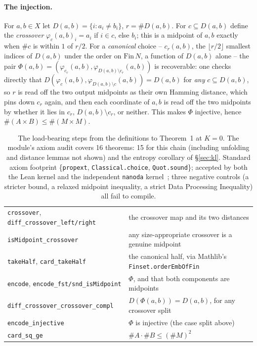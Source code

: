 \documentclass[11pt,a4paper]{article}
\newcommand{\lean}[1]{\texttt{\small #1}}
\begin{document}
\paragraph{The injection.} For $a,b\in X$ let $D(a,b)=\{i:a_i\ne b_i\}$, $r=\#D(a,b)$. For
$c\subseteq D(a,b)$ define the \emph{crossover} $\varphi_c(a,b)_i=a_i$ if $i\in c$, else $b_i$; this is a
midpoint of $a,b$ exactly when $\#c$ is within $1$ of $r/2$. For a \emph{canonical} choice --
$c_r(a,b)$, the $\lfloor r/2\rfloor$ smallest indices of $D(a,b)$ under the order on $\mathrm{Fin}\,N$,
a function of $D(a,b)$ alone -- the pair
$\Phi(a,b)=(\varphi_{c_r}(a,b),\varphi_{D(a,b)\setminus c_r}(a,b))$ is recoverable: one checks directly
that $D(\varphi_c(a,b),\varphi_{D(a,b)\setminus c}(a,b))=D(a,b)$ for \emph{any} $c\subseteq D(a,b)$, so
$r$ is read off the two output midpoints as their own Hamming distance, which pins down $c_r$ again, and
then each coordinate of $a,b$ is read off the two midpoints by whether it lies in $c_r$,
$D(a,b)\setminus c_r$, or neither. This makes $\Phi$ injective, hence
$\#(A\times B)\le\#(M\times M)$.

\begin{table}[h]\centering\small
\begin{tabular}{@{}ll@{}}
\toprule
\lean{crossover}, \lean{diff\_crossover\_left/right} & the crossover map and its two distances \\
\lean{isMidpoint\_crossover} & any size-appropriate crossover is a genuine midpoint \\
\lean{takeHalf}, \lean{card\_takeHalf} & the canonical half, via Mathlib's \lean{Finset.orderEmbOfFin} \\
\lean{encode}, \lean{encode\_fst/snd\_isMidpoint} & $\Phi$, and that both components are midpoints \\
\lean{diff\_crossover\_crossover\_compl} & $D(\Phi(a,b))=D(a,b)$, for any crossover split \\
\lean{encode\_injective} & $\Phi$ is injective (the case split above) \\
\lean{card\_sq\_ge} & \textbf{$\#A\cdot\#B\le(\#M)^2$} \\
\bottomrule
\end{tabular}
\caption{The load-bearing steps from the definitions to Theorem~1 at $K=0$. The module's axiom audit
covers 16 theorems: 15 for this chain (including unfolding and distance lemmas not shown) and the
entropy corollary of \S\ref{sec:kl}. Standard axiom
footprint \{\lean{propext}, \lean{Classical.choice}, \lean{Quot.sound}\}; accepted by both the Lean
kernel and the independent \lean{nanoda} kernel~\cite{Comparator}; three negative controls (a stricter
bound, a relaxed midpoint inequality, a strict Data Processing Inequality) all fail to compile.}
\end{table}
\end{document}
